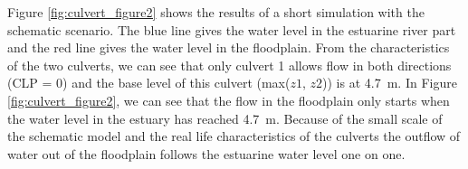 Figure \ref{fig:culvert_figure2} shows the results of a short simulation with
the schematic scenario.
The blue line gives the water level in the estuarine river part and the red line
gives the water level in the floodplain.
From the characteristics of the two culverts, we can see that only culvert 1
allows flow in both directions (CLP = 0)
and the base level of this culvert (max($z1$, $z2$)) is at 4.7~m.
In Figure \ref{fig:culvert_figure2}, we can see that the flow in the floodplain
only starts when the water level in the estuary has reached 4.7~m.
Because of the small scale of the schematic model and the real life
characteristics of the culverts the outflow
of water out of the floodplain follows the estuarine water level one on one.
